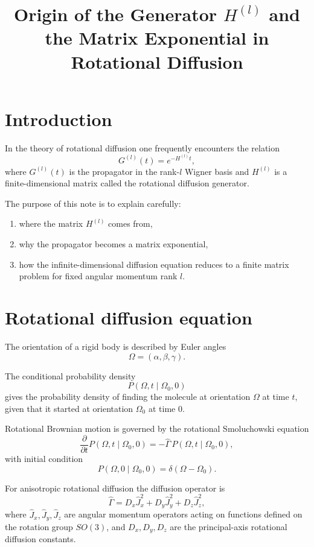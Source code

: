 \documentclass[11pt]{article}
\title{Origin of the Generator \(H^{(l)}\) and the Matrix Exponential in Rotational Diffusion}
\author{}
\date{}
\begin{document}
\maketitle

\section{Introduction}

In the theory of rotational diffusion one frequently encounters the relation
\[
G^{(l)}(t)=e^{-H^{(l)}t},
\]
where \(G^{(l)}(t)\) is the propagator in the rank-\(l\) Wigner basis and
\(H^{(l)}\) is a finite-dimensional matrix called the rotational diffusion
generator.

The purpose of this note is to explain carefully:

\begin{enumerate}
\item where the matrix \(H^{(l)}\) comes from,
\item why the propagator becomes a matrix exponential,
\item how the infinite-dimensional diffusion equation reduces to a finite
matrix problem for fixed angular momentum rank \(l\).
\end{enumerate}

\section{Rotational diffusion equation}

The orientation of a rigid body is described by Euler angles
\[
\Omega=(\alpha,\beta,\gamma).
\]

The conditional probability density
\[
P(\Omega,t\mid\Omega_0,0)
\]
gives the probability density of finding the molecule at orientation
\(\Omega\) at time \(t\), given that it started at orientation
\(\Omega_0\) at time \(0\).

Rotational Brownian motion is governed by the rotational Smoluchowski
equation
\[
\frac{\partial}{\partial t}
P(\Omega,t\mid\Omega_0,0)
=
-\hat{\Gamma}\,
P(\Omega,t\mid\Omega_0,0),
\]
with initial condition
\[
P(\Omega,0\mid\Omega_0,0)
=
\delta(\Omega-\Omega_0).
\]

For anisotropic rotational diffusion the diffusion operator is
\[
\hat{\Gamma}
=
D_x \hat{J}_x^2
+
D_y \hat{J}_y^2
+
D_z \hat{J}_z^2,
\]
where \(\hat{J}_x,\hat{J}_y,\hat{J}_z\) are angular momentum operators acting
on functions defined on the rotation group \(SO(3)\), and
\(D_x,D_y,D_z\) are the principal-axis rotational diffusion constants.
\end{document}
